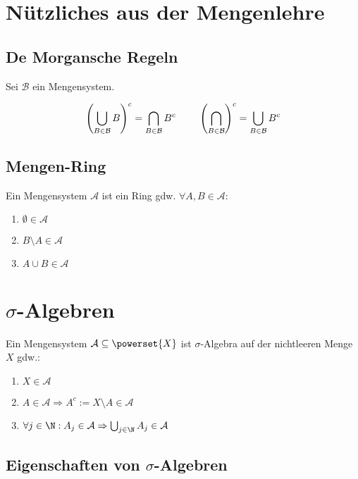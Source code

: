 \newcommand{\A}{\mathcal{A}}
\newcommand{\B}{\mathcal{B}}
\newcommand{\C}{\mathcal{C}}
\newcommand{\E}{\mathcal{E}}
\newcommand{\F}{\mathcal{F}}
\newcommand{\J}{\mathcal{J}}
\renewcommand{\L}{\mathcal{L}}

\section*{Nützliches aus der Mengenlehre}

\subsection*{De Morgansche Regeln}

Sei $\B$ ein Mengensystem.

$$\left(\bigcup_{B\in \B} B \right)^c = \bigcap_{B\in \B} B^c \hspace*{8mm} \left(\bigcap_{B\in \B} \right)^c = \bigcup_{B\in \B} B^c$$

\subsection*{Mengen-Ring}

Ein Mengensystem $\A$ ist ein Ring gdw. $\forall A, B \in \A$:

\begin{enumerate}[label=(\alph*)]
	\item $\emptyset \in \A$
	\item $B\setminus A \in \A$
	\item $A \cup B \in \A$
\end{enumerate}

\section*{$\sigma$-Algebren}

Ein Mengensystem $\A \subseteq \powerset{X}$ ist $\sigma$-Algebra auf der nichtleeren Menge $X$ gdw.:

\begin{enumerate}[label=(\alph*)]
	\item $X \in \A$
	\item $A \in \A \Rightarrow A^c := X\setminus A \in \A$
	\item $\forall j \in \N : A_j \in \A \Rightarrow \bigcup_{j\in \N} A_j \in \A$
\end{enumerate}

\subsection*{Eigenschaften von $\sigma$-Algebren}

